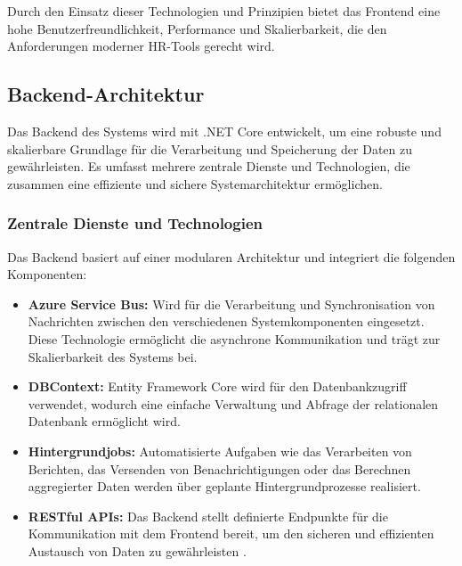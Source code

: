 Durch den Einsatz dieser Technologien und Prinzipien bietet das Frontend eine hohe Benutzerfreundlichkeit, Performance und Skalierbarkeit, die den Anforderungen moderner HR-Tools gerecht wird.



\subsection{Backend-Architektur}

Das Backend des Systems wird mit .NET Core entwickelt, um eine robuste und skalierbare Grundlage für die Verarbeitung und Speicherung der Daten zu gewährleisten. Es umfasst mehrere zentrale Dienste und Technologien, die zusammen eine effiziente und sichere Systemarchitektur ermöglichen.\cite{azureArchitecture2024}

\subsubsection*{Zentrale Dienste und Technologien}
Das Backend basiert auf einer modularen Architektur und integriert die folgenden Komponenten:
\begin{itemize}
    \item \textbf{Azure Service Bus:} Wird für die Verarbeitung und Synchronisation von Nachrichten zwischen den verschiedenen Systemkomponenten eingesetzt. Diese Technologie ermöglicht die asynchrone Kommunikation und trägt zur Skalierbarkeit des Systems bei.\cite{azureServiceBus2024}
    \item \textbf{DBContext:} Entity Framework Core wird für den Datenbankzugriff verwendet, wodurch eine einfache Verwaltung und Abfrage der relationalen Datenbank ermöglicht wird.\cite{entityFrameworkCore2020}
    \item \textbf{Hintergrundjobs:} Automatisierte Aufgaben wie das Verarbeiten von Berichten, das Versenden von Benachrichtigungen oder das Berechnen aggregierter Daten werden über geplante Hintergrundprozesse realisiert.\cite{backgroundTasks2017}
    \item \textbf{RESTful APIs:} Das Backend stellt definierte Endpunkte für die Kommunikation mit dem Frontend bereit, um den sicheren und effizienten Austausch von Daten zu gewährleisten \cite{microsoftDotNet}.
\end{itemize}


